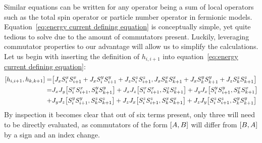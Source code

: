 Similar equations can be written for any operator being a sum of local operators such as
the total spin operator or particle number operator in fermionic models. Equation~\eqref{eq:energy current defining equation} is
conceptually simple, yet quite tedious to solve due to the amount of commutators present. Luckily, leveraging commutator properties
to our advantage will allow us to simplify the calculations. Let us begin with inserting the definition of \(h_{i,i+1}\) into 
equation~\eqref{eq:energy current defining equation}:
\begin{align*}
    \comm{h_{i,i+1}}{h_{k,k+1}} =& \comm{J_{x} \Sx_{i}\Sx_{i+1} + J_{x} \Sy_{i}\Sy_{i+1} + J_{z} \Sz_{i}\Sz_{i+1}}{J_{x} \Sx_{k}\Sx_{k+1} + J_{x} \Sy_{k}\Sy_{k+1} + J_{z} \Sz_{k}\Sz_{k+1}}\\
    =& J_{x} J_{y}\comm{\Sx_{i}\Sx_{i+1}}{\Sy_{k}\Sy_{k+1}} + J_{x} J_{z}\comm{\Sx_{i}\Sx_{i+1}}{\Sz_{k}\Sz_{k+1}} + J_{y} J_{x}\comm{\Sy_{i}\Sy_{i+1}}{\Sx_{k}\Sx_{k+1}}\\
    +& J_{y} J_{z}\comm{\Sy_{i}\Sy_{i+1}}{\Sz_{k}\Sz_{k+1}} + J_{z} J_{x}\comm{\Sz_{i}\Sz_{i+1}}{\Sx_{k}\Sx_{k+1}} + J_{z} J_{y}\comm{\Sz_{i}\Sz_{i+1}}{\Sy_{k}\Sy_{k+1}}  
\end{align*}
By inspection it becomes clear that out of six terms present, only three will need to be directly evaluated, as commutators of the form
\(\comm{A}{B}\) will differ from \(\comm{B}{A}\) by a sign and an index change.


